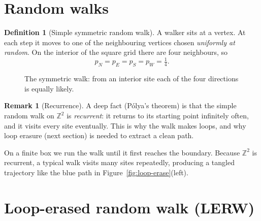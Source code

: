 \documentclass[11pt]{article}
\theoremstyle{definition}
\newtheorem{definition}{Definition}[section]
\newtheorem{remark}{Remark}[section]
\theoremstyle{plain}
\newcommand{\Z}{\mathbb{Z}}
\begin{document}
\section{Random walks}

\begin{definition}[Simple symmetric random walk]
A walker sits at a vertex. At each step it moves to one of the neighbouring
vertices chosen \emph{uniformly at random}. On the interior of the square grid
there are four neighbours, so
\[
   p_N=p_E=p_S=p_W=\tfrac14 .
\]
\end{definition}

\begin{figure}[h]
\centering
{}
\caption{The symmetric walk: from an interior site each of the four directions
is equally likely.}
\label{fig:srw}
\end{figure}

\begin{remark}[Recurrence]
A deep fact (Pólya's theorem) is that the simple random walk on $\Z^2$ is
\emph{recurrent}: it returns to its starting point infinitely often, and it
visits every site eventually. This is why the walk makes loops, and why loop
erasure (next section) is needed to extract a clean path.
\end{remark}

On a finite box we run the walk until it first reaches the boundary. Because
$\Z^2$ is recurrent, a typical walk visits many sites repeatedly, producing a
tangled trajectory like the blue path in Figure~\ref{fig:loop-erase}(left).

\section{Loop-erased random walk (LERW)}
\end{document}
